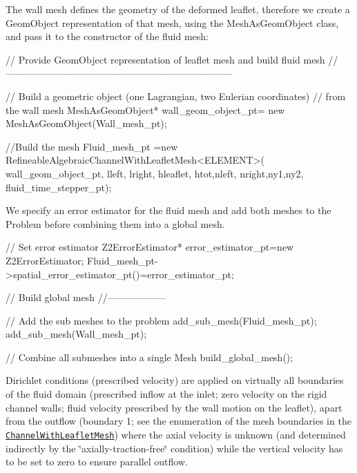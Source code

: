 The wall mesh defines the geometry of the deformed leaflet, therefore we create a {\ttfamily Geom\+Object} representation of that mesh, using the {\ttfamily Mesh\+As\+Geom\+Object} class, and pass it to the constructor of the fluid mesh\+:


\begin{DoxyCodeInclude}


 \textcolor{comment}{// Provide GeomObject representation of leaflet mesh and build fluid mesh}
 \textcolor{comment}{//-----------------------------------------------------------------------}

 \textcolor{comment}{// Build a geometric object (one Lagrangian, two Eulerian coordinates)}
 \textcolor{comment}{// from the wall mesh}
 MeshAsGeomObject* wall\_geom\_object\_pt=
  \textcolor{keyword}{new} MeshAsGeomObject(Wall\_mesh\_pt); 

\textcolor{comment}{//Build the mesh}
 Fluid\_mesh\_pt =\textcolor{keyword}{new} RefineableAlgebraicChannelWithLeafletMesh<ELEMENT>(
  wall\_geom\_object\_pt,
  lleft, lright,
  hleaflet,
  htot,nleft,
  nright,ny1,ny2,
  fluid\_time\_stepper\_pt);

\end{DoxyCodeInclude}


We specify an error estimator for the fluid mesh and add both meshes to the {\ttfamily Problem} before combining them into a global mesh.


\begin{DoxyCodeInclude}

 \textcolor{comment}{// Set error estimator}
 Z2ErrorEstimator* error\_estimator\_pt=\textcolor{keyword}{new} Z2ErrorEstimator;
 Fluid\_mesh\_pt->spatial\_error\_estimator\_pt()=error\_estimator\_pt;



 \textcolor{comment}{// Build global mesh}
 \textcolor{comment}{//------------------}
 
 \textcolor{comment}{// Add the sub meshes to the problem}
 add\_sub\_mesh(Fluid\_mesh\_pt);
 add\_sub\_mesh(Wall\_mesh\_pt);

 \textcolor{comment}{// Combine all submeshes into a single Mesh}
 build\_global\_mesh();

\end{DoxyCodeInclude}


Dirichlet conditions (prescribed velocity) are applied on virtually all boundaries of the fluid domain (prescribed inflow at the inlet; zero velocity on the rigid channel walls; fluid velocity prescribed by the wall motion on the leaflet), apart from the outflow (boundary 1; see the enumeration of the mesh boundaries in the \href{../../../meshes/mesh_list/html/index.html#channel_with_leaflet}{\tt {\ttfamily Channel\+With\+Leaflet\+Mesh}}) where the axial velocity is unknown (and determined indirectly by the \char`\"{}axially-\/traction-\/free\char`\"{} condition) while the vertical velocity has to be set to zero to ensure parallel outflow.


